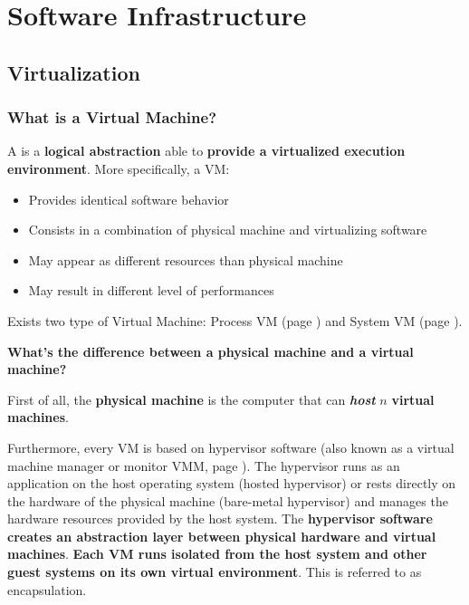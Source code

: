 \section{Software Infrastructure}

\subsection{Virtualization}\label{subsection: virtualization}

\subsubsection{What is a Virtual Machine?}

A  is a \textbf{logical abstraction} able to \textbf{provide a virtualized execution environment}. More specifically, a VM:
\begin{itemize}
    \item Provides identical software behavior
    \item Consists in a combination of physical machine and virtualizing software
    \item May appear as different resources than physical machine
    \item May result in different level of performances
\end{itemize}
Exists two type of Virtual Machine: Process VM (page \pageref{Process VM}) and System VM (page \pageref{System VM}).

\highspace
\begin{flushleft}
    \textcolor{Green3}{ \textbf{What's the difference between a physical machine and a virtual machine?}}
\end{flushleft}
First of all, the \textbf{physical machine} is the computer that can \textbf{\emph{host}} $n$ \textbf{virtual machines}. 

\highspace
Furthermore, every VM is based on hypervisor software (also known as a virtual machine manager or monitor VMM, page \pageref{subsubsection: Virtual Machine Managers (VMM)}). The hypervisor runs as an application on the host operating system (hosted hypervisor) or rests directly on the hardware of the physical machine (bare-metal hypervisor) and manages the hardware resources provided by the host system. The \textbf{hypervisor software creates an abstraction layer between physical hardware and virtual machines}. \textbf{Each VM runs isolated from the host system and other guest systems on its own virtual environment}. This is referred to as encapsulation. 

